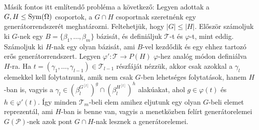 Másik fontos itt említendő probléma a következő:
Legyen adottak a $G, H \le \operatorname{Sym}(\Omega)$ csoportok, a $G\cap H$ csoportnak szeretnénk egy generátorrendszerét meghatározni.
Feltehetjük, hogy $|G| \le |H|$.
Először számoljuk ki $G$-nek egy $B = \{\beta_1, \dots, \beta_m\}$ bázisát, és definiáljuk $\mathcal{T}$-t és $\varphi$-t, mint eddig.
Számoljuk ki $H$-nak egy olyan bázisát, ami $B$-vel kezdődik és egy ehhez tartozó erős generátorrendszert.
Legyen $\varphi' : \mathcal{T} \to P(H)$ $\varphi$-hez analóg módon definiálva $H$-ra.
Ha $t = (\gamma_1, \dots, \gamma_{l-1}) \in \mathcal{T}_{l-1}$ részfáját nézzük, akkor csak azokkal a $\gamma_l$ elemekkel kell folytatnunk,
amik nem csak $G$-ben lehetséges folytatások, hanem $H$-ban is, vagyis a $\gamma_l \in (\beta_l^{G^{[l]}})^g \cap (\beta_l^{H^{[l]}})^h$ alakúakat,
ahol $g \in \varphi(t)$ és $h \in \varphi'(t)$.
Így minden $\mathcal{T}_m$-beli elem amihez eljutunk egy olyan $G$-beli elemet reprezentál, ami $H$-ban is benne van,
vagyis a menetközben felírt generátorelemei $G(\mathcal{P})$-nek azok pont $G\cap H$-nak lesznek a generátorelemei.
